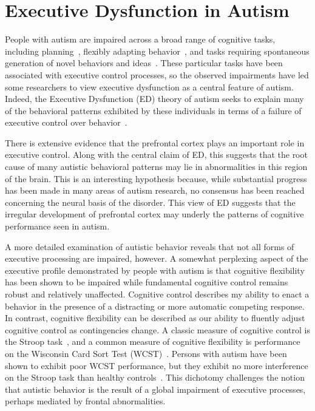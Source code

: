 \documentclass[man]{apa}
\begin{document}
\section{Executive Dysfunction in Autism}

People with autism are impaired across a
broad range of cognitive tasks, including
planning~\cite{BennettoL:1996:AutismPlanningWCST}, flexibly adapting
behavior~\cite{BennettoL:1996:AutismPlanningWCST,Ozonoff:1999:AutismStroopWCST},
and tasks requiring spontaneous generation of novel behaviors and
ideas~\cite{TurnerW:1999:AutismGenerativity}.  These particular tasks have
been associated with executive control processes, so the observed
impairments have led some researchers to view executive dysfunction as
a central feature of autism.  Indeed, the Executive Dysfunction (ED)
theory of autism seeks to explain many of the behavioral patterns
exhibited by these individuals in terms of a failure of executive
control over behavior~\cite{HughesC:1994:AutismExecutiveDysfunction}.

There is extensive evidence that the prefrontal cortex plays an
important role in executive control.  Along with the central claim of
ED, this suggests that the root cause of many autistic behavioral
patterns may lie in abnormalities in this region of the brain.  This
is an interesting hypothesis because, while substantial progress has
been made in many areas of autism research, no consensus has been
reached concerning the neural basis of the disorder.  This view of ED
suggests that the irregular development of prefrontal cortex may
underly the patterns of cognitive performance seen in autism.

A more detailed examination of autistic behavior reveals that not all
forms of executive processing are impaired, however.  A somewhat
perplexing aspect of the executive profile demonstrated by people with
autism is that cognitive flexibility has been shown to be impaired
while fundamental cognitive control remains robust and relatively
unaffected.  Cognitive control describes my ability to enact a
behavior in the presence of a distracting or more automatic competing
response.  In contrast, cognitive flexibility can be described as our
ability to fluently adjust cognitive control as contingencies change.
A classic measure of cognitive control is the Stroop
task~\cite{StroopJR:1935:Interference}, and a common measure of
cognitive flexibility is performance on the Wisconsin Card Sort Test
(WCST)~\cite{BergEA:1948:WCST}.  Persons with autism have been shown
to exhibit poor WCST performance, but they exhibit no more
interference on the Stroop task than healthy
controls~\cite{Ozonoff:1999:AutismStroopWCST}.  This dichotomy
challenges the notion that autistic behavior is the result of a global
impairment of executive processes, perhaps mediated by frontal
abnormalities.
\end{document}
